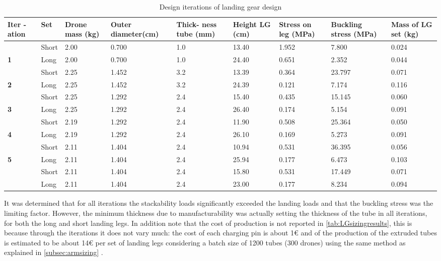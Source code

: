 \begin{longtable}[h]{|p{1cm}|p{1cm}|p{1cm}|p{2cm}|p{1cm}|p{1cm}|p{1cm}|p{1.5cm}|p{1.8cm}|}
\caption{Design iterations of landing gear design}
\label{tab:LGsizingresults}\\
\hline
\textbf{Iter -ation} & \textbf{Set} & \textbf{Drone mass (kg)} & \textbf{Outer diameter(cm)} & \textbf{Thick- ness tube (mm)} & \textbf{Height LG (cm)} & \textbf{Stress on leg (MPa)} & \textbf{Buckling stress (MPa)} & \textbf{Mass of LG set (kg)} \\ \hline
\endfirsthead
%
\endhead
%
 & Short & 2.00 & 0.700 & 1.0 & 13.40 & 1.952 & 7.800 & 0.024 \\ \cline{2-9} 
\multirow{-2}{*}{\textbf{1}} & Long & 2.00 & 0.700 & 1.0 & 24.40 & 0.651 & 2.352 & 0.044 \\ \hline
 & Short & 2.25 & 1.452 & 3.2 & 13.39 & 0.364 & 23.797 & 0.071 \\ \cline{2-9} 
\multirow{-2}{*}{\textbf{2}} & Long & 2.25 & 1.452 & 3.2 & 24.39 & 0.121 & 7.174 & 0.116 \\ \hline
 & Short & 2.25 & 1.292 & 2.4 & 15.40 & 0.435 & 15.145 & 0.060 \\ \cline{2-9} 
\multirow{-2}{*}{\textbf{3}} & Long & 2.25 & 1.292 & 2.4 & 26.40 & 0.174 & 5.154 & 0.091 \\ \hline
 & Short & 2.19 & 1.292 & 2.4 & 11.90 & 0.508 & 25.364 & 0.050 \\ \cline{2-9} 
\multirow{-2}{*}{\textbf{4}} & Long & 2.19 & 1.292 & 2.4 & 26.10 & 0.169 & 5.273 & 0.091 \\ \hline
 & Short & 2.11 & 1.404 & 2.4 & 10.94 & 0.531 & 36.395 & 0.056 \\ \cline{2-9} 
\multirow{-2}{*}{\textbf{5}} & Long & 2.11 & 1.404 & 2.4 & 25.94 & 0.177 & 6.473 & 0.103 \\ \hline
\rowcolor[HTML]{DDEBF7} 
\cellcolor[HTML]{DDEBF7} & Short & 2.11 & 1.404 & 2.4 & 15.80 & 0.531 & 17.449 & 0.071 \\ \cline{2-9} 
\rowcolor[HTML]{DDEBF7} 
\multirow{-2}{*}{\cellcolor[HTML]{DDEBF7}\textbf{Final}} & Long & 2.11 & 1.404 & 2.4 & 23.00 & 0.177 & 8.234 & 0.094 \\ \hline
\end{longtable}

It was determined that for all iterations the stackability loads significantly exceeded the landing loads and that the buckling stress was the limiting factor. However, the minimum thickness due to manufacturability was actually setting the thickness of the tube in all iterations, for both the long and short landing legs. In addition note that the cost of production is not reported in \autoref{tab:LGsizingresults}, this is because through the iterations it does not vary much: the cost of each charging pin is about 1€ and of the production of the extruded tubes is estimated to be about 14€ per set of landing legs considering a batch size of 1200 tubes (300 drones) using the same method as explained in  \autoref{subsec:armsizing} \cite{materialbible}.

